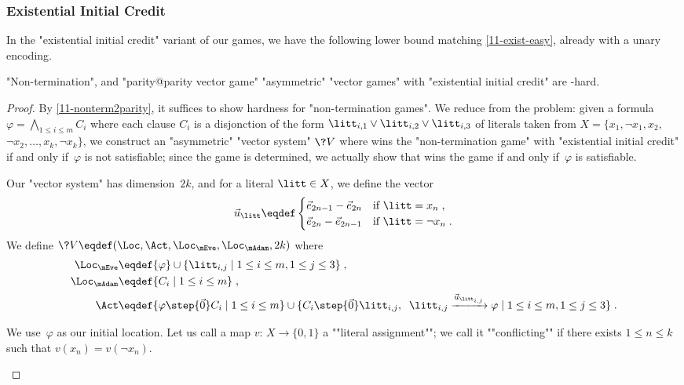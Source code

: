 \subsubsection{Existential Initial Credit}
In the "existential initial credit" variant of our games, we have the
following lower bound matching \cref{11-exist-easy}, already with a
unary encoding.

\begin{theorem}\label{11-exist-hard}
  "Non-termination", and "parity@parity vector game"
  "asymmetric" "vector games" with "existential initial credit" are
  \coNP-hard.%
\end{theorem}
\begin{proof}
  By \cref{11-nonterm2parity}, it suffices to show hardness for
  "non-termination games".  We reduce from the  problem:
  given a formula $\varphi=\bigwedge_{1\leq i\leq m}C_i$ where each
  clause $C_i$ is a disjonction of the form
  $\litt_{i,1}\vee\litt_{i,2}\vee\litt_{i,3}$ of literals taken from
  $X=\{x_1,\neg x_1,x_2,$ $\neg x_2,\dots,x_k,\neg x_k\}$, we construct
  an "asymmetric" "vector system" $\?V$ where \Eve wins the
  "non-termination game" with "existential initial credit" if and only
  if~$\varphi$ is not satisfiable; since the game is determined, we
  actually show that \Adam wins the game if and only if~$\varphi$ is
  satisfiable.

  Our "vector system" has dimension~$2k$, and for a literal
  $\litt\in X$, we define the vector
  \begin{equation*}
    \vec u_\litt\eqdef\begin{cases}
      \vec e_{2n-1}-\vec e_{2n}&\text{if }\litt=x_n\;,\\
      \vec e_{2n}-\vec e_{2n-1}&\text{if }\litt=\neg x_n\;.
    \end{cases}
  \end{equation*}
  We define $\?V\eqdef(\Loc,\Act,\Loc_\mEve,\Loc_\mAdam,2k)$ where
  \begin{align*}
    \Loc_\mEve&\eqdef\{\varphi\}\cup\{\litt_{i,j}\mid 1\leq i\leq m,1\leq j\leq
                3\}\;,\\
    \Loc_\mAdam&\eqdef\{C_i\mid 1\leq i\leq m\}\;,\\
    \Act&\eqdef\{\varphi\step{\vec 0}C_i\mid 1\leq i\leq m\}\cup\{C_i\step{\vec 0}\litt_{i,j},\;\;\litt_{i,j}\xrightarrow{\vec u_{\litt_{i,j}}}\varphi\mid 1\leq i\leq m,1\leq j\leq 3\}\;.
  \end{align*}
  \begin{scope}
    We use~$\varphi$ as our initial location.
    Let us call a map $v{:}\,X\to\{0,1\}$ a ""literal assignment""; we
    call it ""conflicting"" if there exists $1\leq n\leq k$ such that
    $v(x_n)=v(\neg x_n)$.


\end{scope}
\end{proof}
